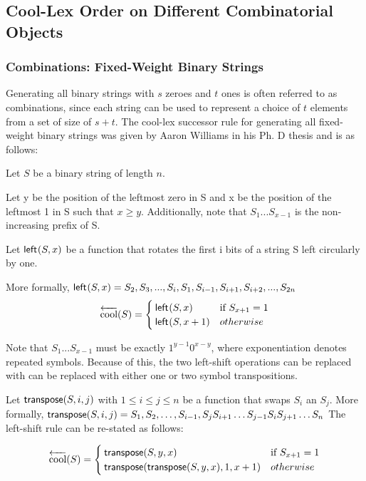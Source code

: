 \subsection{Cool-Lex Order on Different Combinatorial Objects}
\subsubsection{Combinations: Fixed-Weight Binary Strings}
Generating all binary strings with $s$ zeroes and $t$ ones is often referred to as combinations, since each string can be used to represent a choice of $t$ elements from a set of size of $s+t$.  The cool-lex successor rule for generating all fixed-weight binary strings was given by Aaron Williams in his Ph. D thesis and is as follows\cite{williams2009shift}:

\noindent Let $S$ be a binary string of length $n$.

\noindent Let y be the position of the leftmost zero in S and x be the position of the leftmost 1 in S such that $x \ge y$.  Additionally, note that $S_1...S_{x-1}$ is the non-increasing prefix of S.

Let $\mathsf{left}_{}(S,x)$ be a function that rotates the first i bits of a string S left circularly by one.

More formally, 
\noindent $\mathsf{left}_{}(S,x)=S_2,S_3,...,S_i,S_1,S_{i-1},S_{i+1},S_{i+2},...,S_{2n}$
\begin{equation*}
    \overleftarrow{\text{cool}}(S) = \begin{cases}
	\mathsf{left}_{}(S,x) & \text{if $S_{x+1}=1$}\\
	\mathsf{left}_{}(S,x+1) & otherwise\\
\end{cases}
\end{equation*}

Note that $S_1...S_{x-1}$ must be exactly $1^{y-1}0^{x-y}$, where exponentiation denotes repeated symbols.  Because of this, the two left-shift operations can be replaced with can be replaced with either one or two symbol transpositions.  

\noindent Let $\mathsf{transpose(} S, i, j \mathsf{)}$ with $1 \le i \le j \le n$ be a function that swaps $S_i$ an $S_j$.  More formally, $\mathsf{transpose(} S, i, j \mathsf{)}=S_1,S_2,\dots,S_{i-1},S_{j}S_{i+1}\dots S_{j-1}S_i S_{j+1}\dots S_n$
The left-shift rule can be re-stated as follows:

\begin{equation*}
    \overleftarrow{\text{cool}}(S) = \begin{cases}
	\mathsf{transpose(} S, y, x \mathsf{)} & \text{if $S_{x+1}=1$}\\
	\mathsf{transpose(} \mathsf{transpose(} S, y, x \mathsf{)}, 1, x+1 \mathsf{)} & otherwise\\
\end{cases}
\end{equation*}


